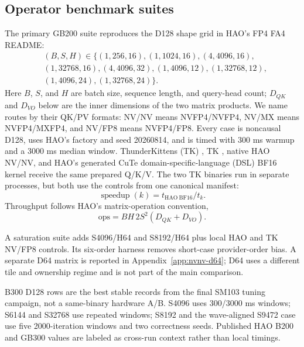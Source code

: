 \subsection{Operator benchmark suites}

The primary GB200 suite reproduces the D128 shape grid in HAO's FP4 FA4
README:
\begin{equation}
\begin{split}
 &(B,S,H)\in\{(1,256,16),(1,1024,16),
 (4,4096,16),\\
 &(1,32768,16),(4,4096,32),(1,4096,12),
 (1,32768,12),\\
 &(1,4096,24),(1,32768,24)\}.
\end{split}
\label{eq:hao-grid}
\end{equation}
Here $B$, $S$, and $H$ are batch size, sequence length, and query-head count;
$D_{QK}$ and $D_{VO}$ below are the inner dimensions of the two matrix
products.
We name routes by their QK/PV formats: NV/NV means NVFP4/NVFP4, NV/MX means
NVFP4/MXFP4, and NV/FP8 means NVFP4/FP8.
Every case is noncausal D128, uses HAO's
 factory and seed 20260814, and is
timed with 300 ms warmup and a 3000 ms median window. ThunderKittens (TK)
, TK , native HAO NV/NV, and HAO's generated
CuTe domain-specific-language (DSL) BF16 kernel receive the same
prepared Q/K/V. The two TK binaries run in separate processes, but both use
the controls from one canonical manifest:
\begin{equation}
  \operatorname{speedup}(k)=t_{\mathrm{HAO\ BF16}}/t_k.
  \label{eq:canonical-speedup}
\end{equation}
Throughput follows HAO's matrix-operation convention,
\begin{equation}
  \mathrm{ops}=BH\,2S^2(D_{QK}+D_{VO}).
  \label{eq:hao-flops}
\end{equation}

A saturation suite adds S4096/H64 and S8192/H64 plus local HAO and TK NV/FP8
controls. Its six-order harness removes short-case provider-order bias. A
separate D64 matrix is reported in Appendix~\ref{app:nvnv-d64}; D64 uses a
different tile and ownership regime and is not part of the main comparison.

B300 D128 rows are the best stable records from the final SM103 tuning
campaign, not a same-binary hardware A/B. S4096 uses 300/3000 ms windows;
S6144 and S32768 use repeated windows; S8192 and the wave-aligned S9472 case
use five 2000-iteration windows and two correctness seeds. Published HAO B200
and GB300 values are labeled as cross-run context rather than local timings.

